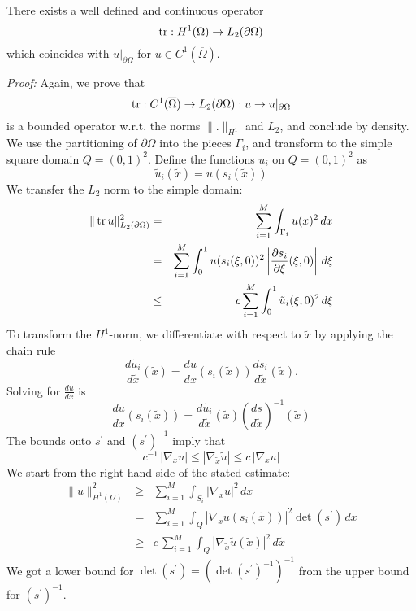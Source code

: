\begin{theorem}
There exists a well defined and continuous operator
$$
\operatorname{tr} : H^1 (\Omega) \rightarrow L_2(\partial \Omega)
$$
which coincides with $u|_{\partial \Omega}$ for $u \in C^1(\overline{\Omega})$.
\end{theorem}
\noindent
{\em Proof:} Again, we prove that 
$$
\operatorname{tr} : C^1(\overline{\Omega}) \rightarrow L_2(\partial \Omega)
        : u \rightarrow u |_{\partial \Omega}
$$
is a bounded operator w.r.t. the norms $\|.\|_{H^1}$ and $L_2$, and conclude by
density.
We use the partitioning of $\partial \Omega$ into the pieces $\Gamma_i$, and
transform to the simple square domain $Q = (0,1)^2$. 
Define the functions $u_i$ on $Q = (0,1)^2$ as
$$
\tilde u_i (\tilde x) = u(s_i(\tilde x))
$$
We transfer the $L_2$ norm to the simple domain:
\begin{eqnarray*}
\| \operatorname{tr} u \|_{L_2(\partial \Omega)}^2 & = & 
        \sum_{i=1}^M \int_{\Gamma_i} u(x)^2 \, dx \\
        & = & 
        \sum_{i=1}^M \int_0^1 u(s_i(\xi,0))^2 \left| \frac{\partial s_i}{\partial \xi} (\xi, 0) \right| \, d \xi \\
        & \leq & c \sum_{i=1}^M \int_0^1 \tilde u_i(\xi,0)^2  \, d \xi  
\end{eqnarray*}
To transform the $H^1$-norm, 
we differentiate with respect to $\tilde x$ by applying the chain rule
$$
\frac{d \tilde u_i}{d \tilde x} (\tilde x) = \frac{d u}{d x} (s_i(\tilde x))
 \frac{d s_i}{d \tilde x} (\tilde x).
$$
Solving for $\frac{d u }{d x}$ is
$$
\frac{d u }{dx} (s_i(\tilde x)) = \frac{ d \tilde u_i}{d \tilde x}(\tilde x)
\left( \frac{ds }{d \tilde x} \right)^{-1} (\tilde x)
$$
The bounds onto $s^\prime$ and $(s^\prime)^{-1}$ imply that
$$
c^{-1} \, |\nabla_x u | \leq | \nabla_{\tilde x} \tilde u | \leq c \, | \nabla_x u |
$$
We start from the right hand side of the stated estimate:
\begin{eqnarray*}
\| u \|_{H^1(\Omega)}^2 & \geq &
 \sum_{i=1}^M \int_{S_i} | \nabla_x u |^2 \, dx \\
 & = & \sum_{i=1}^M \int_Q \left| \nabla_x u (s_i (\tilde x)) \right|^2    \det ( s^\prime ) \, d \tilde x \\
 & \geq & c \,  \sum_{i=1}^M \int_Q \left| \nabla_{\tilde x} \tilde u (\tilde x) \right| ^2  \, d \tilde x
\end{eqnarray*}
We got a lower bound for $\det (s^\prime) = (\det (s^\prime)^{-1})^{-1}$ from the upper bound for $(s^\prime)^{-1}$.


